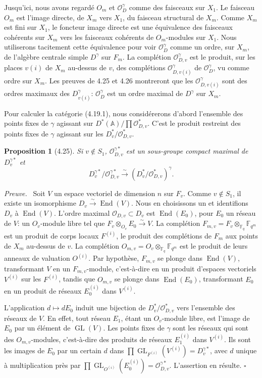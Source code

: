 \documentclass[10pt]{article}
\newcommand{\Fq}{\mathbb F_q}
\newcommand{\Fqm}{\mathbb F_{q^m}}
\newcommand{\Adele}{\mathbb A}
\newcommand{\GL}{\operatorname{GL}}
\newcommand{\End}{\operatorname{End}}
\newcommand{\OD}{\mathcal O_D}
\theoremstyle{deligne}
\newtheorem*{proposition*}{Proposition}
\newenvironment{proofdel}[1][Preuve.]{\textit{#1}\ }{\hfill$\square$}
\begin{document}
Jusqu'ici, nous avons regardé $O_m$ et $\OD^\gamma$ comme des faisceaux sur $X_1$. Le faisceau $O_m$ est l'image directe, de $X_m$ vers $X_1$, du faisceau structural de $X_m$. Comme $X_m$ est fini sur $X_1$, le foncteur image directe est une équivalence des faisceaux cohérents sur $X_m$ vers les faisceaux cohérents de $O_m$-modules sur $X_1$. Nous utiliserons tacitement cette équivalence pour voir $\OD^\gamma$ comme un ordre, sur $X_m$, de l'algèbre centrale simple $D^\gamma$ sur $F_m$. La complétion $\mathcal O_{D,v}^{\gamma}$ est le produit, sur les places $v(i)$ de $X_m$ au-dessus de $v$, des complétions $\mathcal O_{D,v(i)}^{\gamma}$ de $\OD^\gamma$, vu comme ordre sur $X_m$. Les preuves de 4.25 et 4.26 montreront que les $\mathcal O_{D,v(i)}^{\gamma}$ sont des ordres maximaux des $D^\gamma_{v(i)}$: $\OD^\gamma$ est un ordre maximal de $D^\gamma$ sur $X_m$.

Pour calculer la catégorie (4.19.1), nous considérerons d'abord l'ensemble des points fixes de $\gamma$ agissant sur $D^*(\Adele)/\prod\mathcal O_{D,v}^*$. C'est le produit restreint des points fixes de $\gamma$ agissant sur les $D_v^*/\mathcal O_{D,v}^*$.

\begin{proposition*}[4.25]
Si $v\notin S_1$, $\mathcal O_{D,v}^{\gamma *}$ est un sous-groupe compact maximal de $D_v^{\gamma *}$ et
\[
D_v^{\gamma *}/\mathcal O_{D,v}^{\gamma *}\xrightarrow{\sim}(D_v^*/\mathcal O_{D,v}^*)^\gamma.
\]
\end{proposition*}

\begin{proofdel}[Preuve.]
Soit $V$ un espace vectoriel de dimension $n$ sur $F_v$. Comme $v\notin S_1$, il existe un isomorphisme $D_v\xrightarrow{\sim}\End(V)$. Nous en choisissons un et identifions $D_v$ à $\End(V)$. L'ordre maximal $\mathcal O_{D,v}\subset D_v$ est $\End(E_0)$, pour $E_0$ un réseau de $V$: un $O_v$-module libre tel que $F_v\otimes_{O_v}E_0\xrightarrow{\sim}V$. La complétion $F_{m,v}=F_v\otimes_{\Fq}\Fqm$ est un produit de corps locaux $F^{(i)}$, le produit des complétions de $F_m$ aux points de $X_m$ au-dessus de $v$. La complétion $O_{m,v}=O_v\otimes_{\Fq}\Fqm$ est le produit de leurs anneaux de valuation $O^{(i)}$. Par hypothèse, $F_{m,v}$ se plonge dans $\End(V)$, transformant $V$ en un $F_{m,v}$-module, c'est-à-dire en un produit d'espaces vectoriels $V^{(i)}$ sur les $F^{(i)}$, tandis que $O_{m,v}$ se plonge dans $\End(E_0)$, transformant $E_0$ en un produit de réseaux $E_0^{(i)}$ dans $V^{(i)}$.

L'application $d\mapsto dE_0$ induit une bijection de $D_v^*/\mathcal O_{D,v}^*$ vers l'ensemble des réseaux de $V$. En effet, tout réseau $E_1$, étant un $O_v$-module libre, est l'image de $E_0$ par un élément de $\GL(V)$. Les points fixes de $\gamma$ sont les réseaux qui sont des $O_{m,v}$-modules, c'est-à-dire des produits de réseaux $E_1^{(i)}$ dans $V^{(i)}$. Ils sont les images de $E_0$ par un certain $d$ dans $\prod \GL_{F^{(i)}}(V^{(i)})=D_v^{\gamma *}$, avec $d$ unique à multiplication près par $\prod \GL_{O^{(i)}}(E_0^{(i)})=\mathcal O_{D,v}^{\gamma *}$. L'assertion en résulte.
\end{proofdel}
\end{document}
